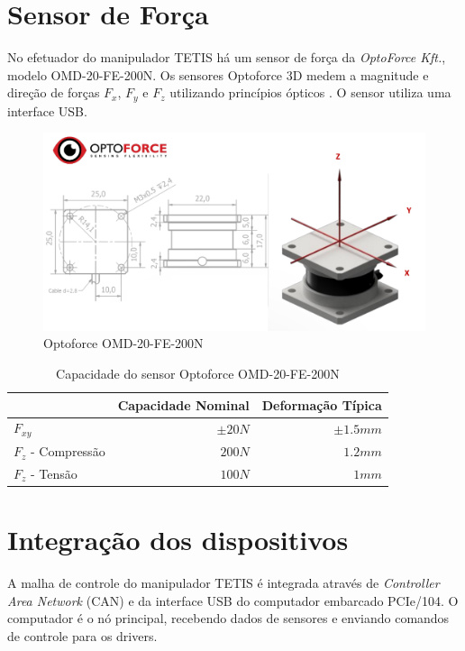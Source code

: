 \section{Sensor de Força} \label{sec:optoforce}

No efetuador do manipulador TETIS há um sensor de força da \textit{OptoForce Kft.}, modelo OMD-20-FE-200N. Os sensores Optoforce 3D medem a magnitude e direção de forças $F_x$, $F_y$ e $F_z$ utilizando princípios ópticos \citep{optoforce}. O sensor utiliza uma interface USB. 

\begin{figure}[!ht]
\centering
  \includegraphics[width=\linewidth]{./img/optoforce.png}
  \caption{Optoforce OMD-20-FE-200N \citep{optoforce}}
  \label{fig:optoforce}
\end{figure}%

\begin{table}[h!]
\centering
\caption{Capacidade do sensor Optoforce OMD-20-FE-200N}
\label{tab:dh_tetis}
\begin{tabular}{lrr} \hline
 &  Capacidade Nominal & Deformação Típica \\ \hline
 $F_{xy}$ & $\pm 20N$ & $\pm 1.5 mm$ \\
 $F_z $ - Compressão & $200N$ & $1.2 mm$ \\
 $F_z $ - Tensão & $100N$ & $1 mm$ \\
\hline
\end{tabular}
\end{table}


\section{Integração dos dispositivos}

A malha de controle do manipulador TETIS é integrada através de \textit{Controller Area Network} (CAN) e da interface USB do computador embarcado PCIe/104. O computador é o nó principal, recebendo dados de sensores e enviando comandos de controle para os drivers.

